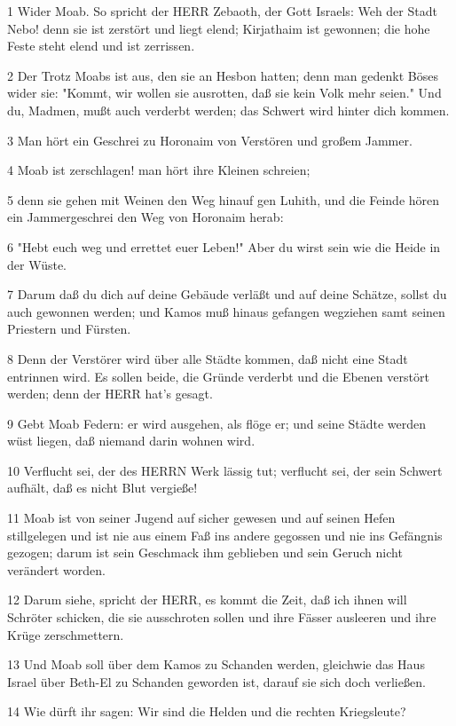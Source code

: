 \par 1 Wider Moab. So spricht der HERR Zebaoth, der Gott Israels: Weh der Stadt Nebo! denn sie ist zerstört und liegt elend; Kirjathaim ist gewonnen; die hohe Feste steht elend und ist zerrissen.
\par 2 Der Trotz Moabs ist aus, den sie an Hesbon hatten; denn man gedenkt Böses wider sie: "Kommt, wir wollen sie ausrotten, daß sie kein Volk mehr seien." Und du, Madmen, mußt auch verderbt werden; das Schwert wird hinter dich kommen.
\par 3 Man hört ein Geschrei zu Horonaim von Verstören und großem Jammer.
\par 4 Moab ist zerschlagen! man hört ihre Kleinen schreien;
\par 5 denn sie gehen mit Weinen den Weg hinauf gen Luhith, und die Feinde hören ein Jammergeschrei den Weg von Horonaim herab:
\par 6 "Hebt euch weg und errettet euer Leben!" Aber du wirst sein wie die Heide in der Wüste.
\par 7 Darum daß du dich auf deine Gebäude verläßt und auf deine Schätze, sollst du auch gewonnen werden; und Kamos muß hinaus gefangen wegziehen samt seinen Priestern und Fürsten.
\par 8 Denn der Verstörer wird über alle Städte kommen, daß nicht eine Stadt entrinnen wird. Es sollen beide, die Gründe verderbt und die Ebenen verstört werden; denn der HERR hat's gesagt.
\par 9 Gebt Moab Federn: er wird ausgehen, als flöge er; und seine Städte werden wüst liegen, daß niemand darin wohnen wird.
\par 10 Verflucht sei, der des HERRN Werk lässig tut; verflucht sei, der sein Schwert aufhält, daß es nicht Blut vergieße!
\par 11 Moab ist von seiner Jugend auf sicher gewesen und auf seinen Hefen stillgelegen und ist nie aus einem Faß ins andere gegossen und nie ins Gefängnis gezogen; darum ist sein Geschmack ihm geblieben und sein Geruch nicht verändert worden.
\par 12 Darum siehe, spricht der HERR, es kommt die Zeit, daß ich ihnen will Schröter schicken, die sie ausschroten sollen und ihre Fässer ausleeren und ihre Krüge zerschmettern.
\par 13 Und Moab soll über dem Kamos zu Schanden werden, gleichwie das Haus Israel über Beth-El zu Schanden geworden ist, darauf sie sich doch verließen.
\par 14 Wie dürft ihr sagen: Wir sind die Helden und die rechten Kriegsleute?
